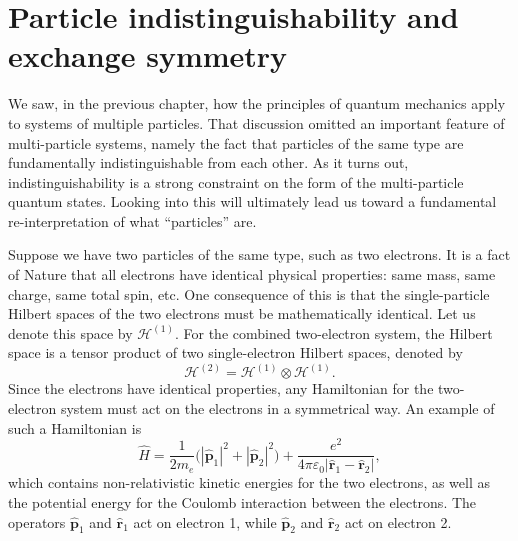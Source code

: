 \documentclass[pra,11pt]{revtex4}
\begin{document}
\section{Particle indistinguishability and exchange symmetry}

We saw, in the previous chapter, how the principles of quantum
mechanics apply to systems of multiple particles.  That discussion
omitted an important feature of multi-particle systems, namely the
fact that particles of the same type are fundamentally
indistinguishable from each other.  As it turns out,
indistinguishability is a strong constraint on the form of the
multi-particle quantum states.  Looking into this will ultimately lead
us toward a fundamental re-interpretation of what ``particles'' are.

Suppose we have two particles of the same type, such as two electrons.
It is a fact of Nature that all electrons have identical physical
properties: same mass, same charge, same total spin, etc.  One
consequence of this is that the single-particle Hilbert spaces of the
two electrons must be mathematically identical.  Let us denote this
space by $\mathscr{H}^{(1)}$.  For the combined two-electron system,
the Hilbert space is a tensor product of two single-electron Hilbert
spaces, denoted by
$$\mathscr{H}^{(2)} = \mathscr{H}^{(1)} \otimes \mathscr{H}^{(1)}.$$
Since the electrons have identical properties, any Hamiltonian for the
two-electron system must act on the electrons in a symmetrical way.
An example of such a Hamiltonian is
$$\hat{H} = \frac{1}{2m_e} \Big(|\hat{\mathbf{p}}_1|^2 + |\hat{\mathbf{p}}_2|^2\Big) + \frac{e^2}{4\pi\varepsilon_0|\hat{\mathbf{r}}_1 - \hat{\mathbf{r}}_2|},$$
which contains non-relativistic kinetic energies for the two
electrons, as well as the potential energy for the Coulomb interaction
between the electrons.  The operators $\hat{\mathbf{p}}_1$ and
$\hat{\mathbf{r}}_1$ act on electron 1, while $\hat{\mathbf{p}}_2$ and
$\hat{\mathbf{r}}_2$ act on electron 2.
\end{document}
